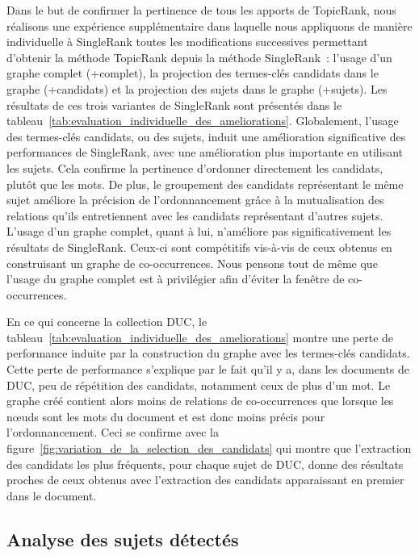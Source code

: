     Dans le but de confirmer la pertinence de tous les apports de TopicRank,
    nous réalisons une expérience supplémentaire dans laquelle nous appliquons
    de manière individuelle à SingleRank toutes les modifications successives
    permettant d'obtenir la méthode TopicRank depuis la méthode SingleRank~:
    l'usage d'un graphe complet (+complet), la projection des termes-clés
    candidats dans le graphe (+candidats) et la projection des sujets dans le
    graphe (+sujets). Les résultats de ces trois variantes de SingleRank sont
    présentés dans le
    tableau~\ref{tab:evaluation_individuelle_des_ameliorations}. Globalement,
    l'usage des termes-clés candidats, ou des sujets, induit une amélioration
    significative des performances de SingleRank, avec une amélioration plus
    importante en utilisant les sujets. Cela confirme la pertinence d'ordonner
    directement les candidats, plutôt que les mots. De plus, le groupement des
    candidats représentant le même sujet améliore la précision de
    l'ordonnancement grâce à la mutualisation des relations qu'ils entretiennent
    avec les candidats représentant d'autres sujets. L'usage d'un graphe
    complet, quant à lui, n'améliore pas significativement les résultats de
    SingleRank. Ceux-ci sont compétitifs vis-à-vis de ceux obtenus en
    construisant un graphe de co-occurrences. Nous pensons tout de même que
    l'usage du graphe complet est à privilégier afin d'éviter la fenêtre de
    co-occurrences.
    
    En ce qui concerne la collection DUC, le
    tableau~\ref{tab:evaluation_individuelle_des_ameliorations} montre une perte
    de performance induite par la construction du graphe avec les termes-clés
    candidats. Cette perte de performance s'explique par le fait qu'il y a, dans
    les documents de DUC, peu de répétition des candidats, notamment ceux de
    plus d'un mot. Le graphe créé contient alors moins de relations de
    co-occurrences que lorsque les n\oe{}uds sont les mots du document et est
    donc moins précis pour l'ordonnancement. Ceci se confirme avec la
    figure~\ref{fig:variation_de_la_selection_des_candidats} qui montre que
    l'extraction des candidats les plus fréquents, pour chaque sujet de DUC,
    donne des résultats proches de ceux obtenus avec l'extraction des candidats
    apparaissant en premier dans le document.

  \subsection{Analyse des sujets détectés}
  \label{subsec:analyse_des_sujets_générés}


